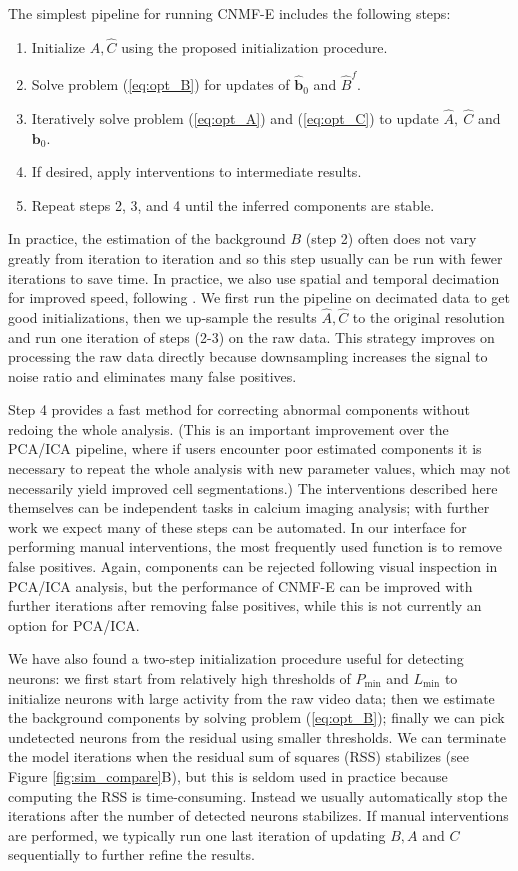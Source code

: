 \documentclass[9pt,lineno]{elife}
\begin{document}
The simplest pipeline for running CNMF-E includes the 
following steps:
\begin{enumerate}
  \item Initialize $\hat{A}, \hat{C}$ using the proposed initialization procedure.
  \item Solve problem (\ref{eq:opt_B}) for updates of $\hat{\bm{b}}_0$ and $\hat{B}^f$.
  \item Iteratively solve problem (\ref{eq:opt_A}) and (\ref{eq:opt_C}) to update $\hat{A}, ~\hat{C}$ and $\bm{b}_0$.
  \item If desired, apply interventions to intermediate results.
  \item Repeat steps 2, 3, and  4 until the inferred components are stable.
\end{enumerate}
In practice, the estimation of the background $B$ (step 2) often does not vary greatly from  iteration to iteration and so this step usually can be run with fewer iterations to save time.
In practice, we also use spatial and temporal decimation for improved speed, following \citep{Friedrich2016}. We first run the pipeline on decimated data to get good initializations, then we up-sample the results $\hat{A}, \hat{C}$ to the original resolution and run one iteration of steps (2-3) on the raw data. This strategy improves on processing the raw data directly because downsampling increases the signal to noise ratio and eliminates many false positives.

Step 4 provides a fast method for correcting abnormal components without redoing the whole analysis. (This is an important improvement over the PCA/ICA pipeline, where if users encounter poor estimated components it is necessary to repeat the whole analysis with new parameter values, which may not necessarily yield improved cell segmentations.) The interventions described here themselves can be independent tasks in calcium imaging analysis; with further work we expect many of these steps can be automated.  In our interface for performing manual interventions, the most frequently used function is to remove false positives. Again, components can be rejected following visual inspection in PCA/ICA analysis, but the performance of CNMF-E can be improved with further iterations after removing false positives, while this is not currently an option for PCA/ICA.

We have also found a two-step initialization procedure useful for detecting neurons: we first start from relatively high thresholds  of $P_{\min}$ and $L_{\min}$ to initialize neurons with large activity from the raw video data; then we estimate the background components by solving problem (\ref{eq:opt_B}); finally we can pick undetected neurons from the residual using smaller thresholds. We can terminate the model iterations when the residual sum of squares (RSS) stabilizes (see Figure \ref{fig:sim_compare}B), but this is seldom used in practice because computing the RSS is time-consuming. Instead we usually automatically stop the iterations after the number of detected neurons stabilizes. If manual interventions are performed, we typically run one last iteration of updating $B, A$ and $C$ sequentially to further refine the results.
\end{document}

